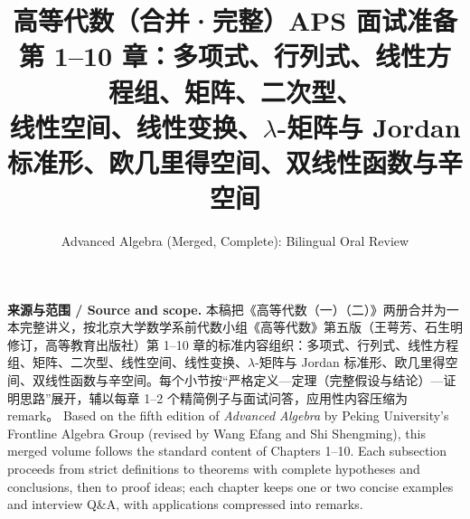 \documentclass[UTF8,11pt,a4paper]{ctexart}
\title{高等代数（合并·完整）APS 面试准备\\[4pt]\large 第 1--10 章：多项式、行列式、线性方程组、矩阵、二次型、\\ 线性空间、线性变换、$\lambda$-矩阵与 Jordan 标准形、欧几里得空间、双线性函数与辛空间}
\author{Advanced Algebra (Merged, Complete): Bilingual Oral Review}
\date{}
\begin{document}
\maketitle

{\footnotesize\noindent\textbf{来源与范围 / Source and scope.} 本稿把《高等代数（一）（二）》两册合并为一本完整讲义，按北京大学数学系前代数小组《高等代数》第五版（王萼芳、石生明修订，高等教育出版社）第 1--10 章的标准内容组织：多项式、行列式、线性方程组、矩阵、二次型、线性空间、线性变换、$\lambda$-矩阵与 Jordan 标准形、欧几里得空间、双线性函数与辛空间。每个小节按“严格定义—定理（完整假设与结论）—证明思路”展开，辅以每章 1--2 个精简例子与面试问答，应用性内容压缩为 remark。 Based on the fifth edition of \emph{Advanced Algebra} by Peking University's Frontline Algebra Group (revised by Wang Efang and Shi Shengming), this merged volume follows the standard content of Chapters 1--10. Each subsection proceeds from strict definitions to theorems with complete hypotheses and conclusions, then to proof ideas; each chapter keeps one or two concise examples and interview Q\&A, with applications compressed into remarks.\par}
\end{document}
